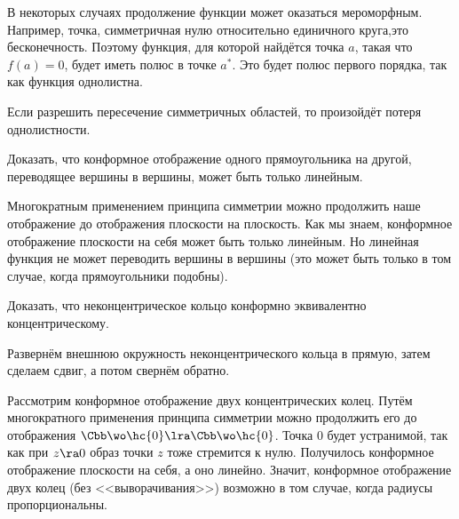 \documentclass[a4paper]{article}
\newenvironment{petit}
{\par \smallskip \hrule \smallskip \footnotesize}
{\par \smallskip \hrule \smallskip}
\begin{document}
\begin{note}
В некоторых случаях продолжение функции может оказаться мероморфным. Например, точка, симметричная нулю относительно
единичного круга,\т это бесконечность. Поэтому функция,  для которой найдётся точка $a$, такая что $f(a)=0$, будет
иметь полюс в точке $a^*$. Это будет полюс первого порядка, так как функция однолистна.
\end{note}

\begin{note}
Если разрешить пересечение симметричных областей, то произойдёт потеря однолистности.
\end{note}

\begin{problem}
Доказать, что конформное отображение одного прямоугольника на другой, переводящее вершины в вершины,
может быть только линейным.
\end{problem}
\begin{solution}
Многократным применением принципа симметрии можно продолжить наше отображение до отображения плоскости на плоскость.
Как мы знаем, конформное отображение плоскости на себя может быть только линейным.
Но линейная функция не может переводить вершины в вершины (это может быть только в том случае, когда прямоугольники
подобны).
\end{solution}

\begin{problem}
Доказать, что неконцентрическое кольцо конформно эквивалентно концентрическому.
\end{problem}
\begin{solution}
Развернём внешнюю окружность неконцентрического кольца в прямую, затем сделаем сдвиг, а потом свернём обратно.
\end{solution}

\begin{ex}
Рассмотрим конформное отображение двух концентрических колец. Путём многократного применения принципа симметрии
можно продолжить его до отображения $\Cbb\wo\hc{0} \lra \Cbb \wo\hc{0}$. Точка $0$ будет устранимой,
так как при $z\ra0$ образ точки $z$ тоже стремится к нулю. Получилось конформное отображение плоскости на себя,
а оно линейно. Значит, конформное отображение двух колец (без <<выворачивания>>) возможно в том случае, когда
радиусы пропорциональны.
\end{ex}

\end{document}
